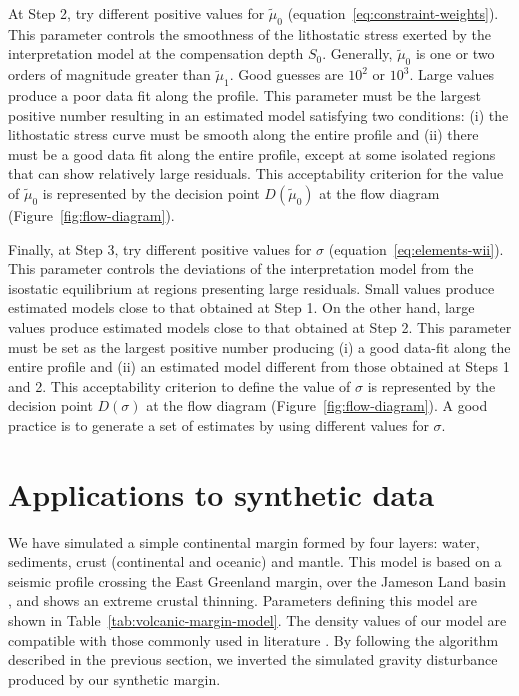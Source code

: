 \documentclass[manuscript]{geophysics}
\begin{document}
At Step 2, try different positive values for $\tilde{\mu}_{0}$ 
(equation~\ref{eq:constraint-weights}). This parameter
controls the smoothness of the lithostatic stress exerted by the interpretation model
at the compensation depth $S_{0}$. Generally, $\tilde{\mu}_{0}$ is one or two 
orders of magnitude greater than $\tilde{\mu}_{1}$. 
Good guesses are $10^{2}$ or $10^{3}$.
Large values produce a poor data fit along the profile.
This parameter must be the largest positive number resulting in an estimated
model satisfying two conditions: (i) the lithostatic stress curve must be smooth
along the entire profile and (ii) there must be a good data fit along the entire
profile, except at some isolated regions that can show relatively large residuals.
This acceptability criterion for the value of $\tilde{\mu}_{0}$ is
represented by the decision point $D(\tilde{\mu}_{0})$ 
at the flow diagram (Figure~\ref{fig:flow-diagram}).

Finally, at Step 3, try different positive values for $\sigma$ (equation~\ref{eq:elements-wii}).
This parameter controls the deviations of the interpretation model from the
isostatic equilibrium at regions presenting large residuals.
Small values produce estimated models close to that obtained at Step 1.
On the other hand, large values produce estimated models close to that
obtained at Step 2.
This parameter must be set as the largest positive number producing (i) a good data-fit
along the entire profile and (ii) an estimated model different from those obtained
at Steps 1 and 2.
This acceptability criterion to define the value of $\sigma$ is
represented by the decision point $D(\sigma)$ 
at the flow diagram (Figure~\ref{fig:flow-diagram}).
A good practice is to generate a set of estimates by using different 
values for $\sigma$. 


\section{Applications to synthetic data}


We have simulated a simple continental margin formed by four layers: 
water, sediments, crust (continental and oceanic) and mantle.
This model is based on a seismic profile crossing the East Greenland margin,
over the Jameson Land basin \citep{peron-etal2013}, and shows an extreme crustal thinning.
Parameters defining this model are shown in Table~\ref{tab:volcanic-margin-model}.
The density values of our model are compatible with those commonly used in literature
\citep[e.g., ][]{gradmann-etal2017}.
By following the algorithm described in the previous section, we inverted the simulated 
gravity disturbance produced by our synthetic margin.
\end{document}
